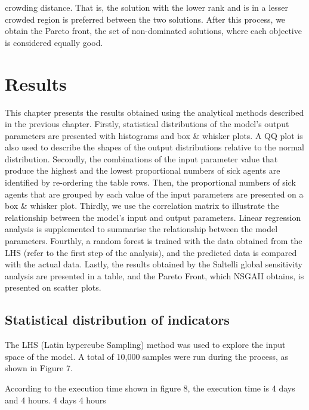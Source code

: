 \documentclass[smallextended]{svjour3}       %
\begin{document}
crowding distance. That is, the solution with the lower rank and is in a lesser crowded region is preferred between the two solutions. After this process, we obtain the Pareto front, the set of non-dominated solutions, where each objective is considered equally good.


\section{Results}


This chapter presents the results obtained using the analytical methods described in the previous chapter.
Firstly, statistical distributions of the model’s output parameters are presented with histograms and box & whisker plots. A QQ plot is also used to describe the shapes of the output distributions relative to the normal distribution.
Secondly, the combinations of the input parameter value that produce the highest and the lowest proportional numbers of sick agents are identified by re-ordering the table rows. Then, the proportional numbers of sick agents that are grouped by each value of the input parameters are presented on a box & whisker plot.
Thirdly, we use the correlation matrix to illustrate the relationship between the model’s input and output parameters. Linear regression analysis is supplemented to summarise the relationship between the model parameters.
Fourthly, a random forest is trained with the data obtained from the LHS (refer to the first step of the analysis), and the predicted data is compared with the actual data.
Lastly, the results obtained by the Saltelli global sensitivity analysis are presented in a table, and the Pareto Front, which NSGAII obtains, is presented on scatter plots.



\subsection{Statistical distribution of indicators}

The LHS (Latin hypercube Sampling) method was used to explore the input space of the model. A total of 10,000 samples were run during the process, as shown in Figure 7.

According to the execution time shown in figure 8, the execution time is 4 days and 4 hours. 4 days 4 hours
\end{document}
